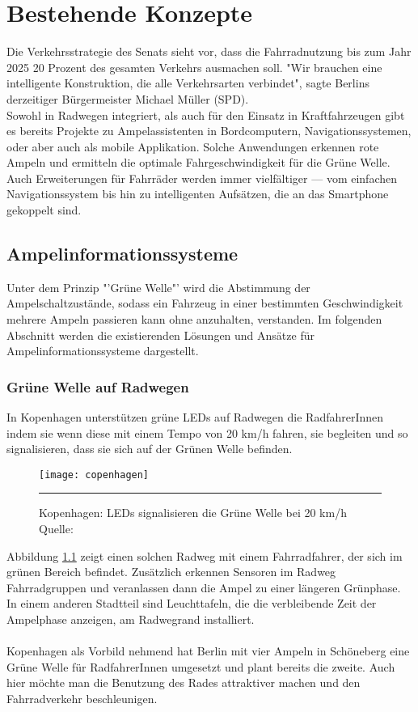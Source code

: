 \chapter{\label{chap:state}Bestehende Konzepte}
Die Verkehrsstrategie des Senats sieht vor, dass die Fahrradnutzung bis zum Jahr 2025 20 Prozent des gesamten Verkehrs ausmachen soll. "Wir brauchen eine intelligente Konstruktion, die alle Verkehrsarten verbindet", sagte Berlins derzeitiger Bürgermeister Michael Müller (SPD). \cite{Mopo}\\
Sowohl in Radwegen integriert, als auch für den Einsatz in Kraftfahrzeugen gibt es bereits Projekte zu Ampelassistenten in Bordcomputern, Navigationssystemen, oder aber auch als mobile Applikation. Solche Anwendungen erkennen rote Ampeln und ermitteln die optimale Fahrgeschwindigkeit für die Grüne Welle. Auch Erweiterungen für Fahrräder werden immer vielfältiger --- vom einfachen Navigationssystem bis hin zu intelligenten Aufsätzen, die an das \gls{Smartphone} gekoppelt sind.
\section{Ampelinformationssysteme}
Unter dem Prinzip "'Grüne Welle"' wird die Abstimmung der Ampelschaltzustände, sodass ein Fahrzeug in einer bestimmten Geschwindigkeit mehrere Ampeln passieren kann ohne anzuhalten, verstanden. Im folgenden Abschnitt werden die existierenden Lösungen und Ansätze für Ampelinformationssysteme dargestellt.
\subsection{Grüne Welle auf Radwegen}
In Kopenhagen unterstützen grüne \glspl{LED} auf Radwegen die RadfahrerInnen indem sie wenn diese mit einem Tempo von 20 km/h fahren, sie begleiten und so signalisieren, dass sie sich auf der Grünen Welle befinden.
\begin{figure}[H]  
    \centering  
    \texttt{[image: copenhagen]} 
    \rule{35em}{0.5pt}   
    \caption[Grüne Welle durch \glspl{LED}]{Kopenhagen: \glspl{LED} signalisieren die Grüne Welle bei 20 km/h  Quelle: \cite{NYT}}
     \label{fig:copenhagen}
\end{figure}
Abbildung \ref{fig:copenhagen} zeigt einen solchen Radweg mit einem Fahrradfahrer, der sich im grünen Bereich befindet. Zusätzlich erkennen Sensoren im Radweg Fahrradgruppen und veranlassen dann die Ampel zu einer längeren Grünphase. In einem anderen Stadtteil sind Leuchttafeln, die die verbleibende Zeit der Ampelphase anzeigen, am Radwegrand installiert\cite{KopIng}. \\\\
Kopenhagen als Vorbild nehmend hat Berlin mit vier Ampeln in Schöneberg eine Grüne Welle für RadfahrerInnen umgesetzt und plant bereits die zweite\cite{BZ}. Auch hier möchte man die Benutzung des Rades attraktiver machen und den Fahrradverkehr beschleunigen.
